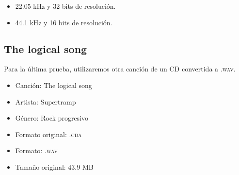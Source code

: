 \documentclass[11pt,a4paper]{article}
\begin{document}
\begin{itemize}
	\item 22.05 kHz y 32 bits de resolución.
	\item 44.1 kHz y 16 bits de resolución.
\end{itemize}

\subsection{The logical song}

Para la última prueba, utilizaremos otra canción de un CD convertida a \textsc{.wav}.

\begin{itemize}
	\item Canción: The logical song
	\item Artista: Supertramp
	\item Género: Rock progresivo
	\item Formato  original: \textsc{.cda}
	\item Formato: \textsc{.wav}
	\item Tamaño original: 43.9 MB
\end{itemize}
\end{document}
